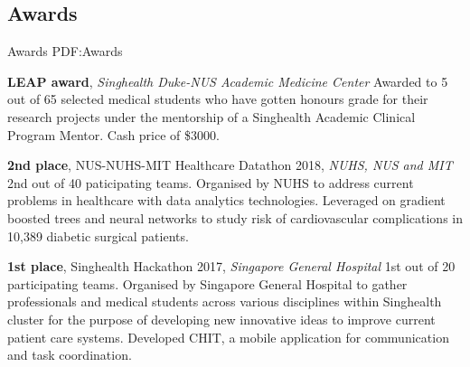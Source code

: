 \documentclass[letterpaper,10pt,oneside]{article}
\begin{document}
\begin{body}
\section
{Awards}
{Awards}
{PDF:Awards}

\textbf{LEAP award}, \textit{Singhealth Duke-NUS Academic Medicine Center}
\hfill{}
\GapNoBreak
\BulletItem
Awarded to 5 out of 65 selected medical students who have gotten honours grade for their research projects under the mentorship of a Singhealth Academic Clinical Program Mentor. Cash price of \$3000.
\GapNoBreak
\medskip

\textbf{2nd place}, \textcolor{mygray}{NUS-NUHS-MIT Healthcare Datathon 2018}, \textit{NUHS, NUS and MIT}
\hfill{}
\GapNoBreak
\BulletItem
2nd out of 40 paticipating teams. Organised by NUHS to address current problems in healthcare with data analytics technologies. Leveraged on gradient boosted trees and neural networks to study risk of cardiovascular complications in 10,389 diabetic surgical patients.
\GapNoBreak
\medskip



\textbf{1st place}, \textcolor{mygray}{Singhealth Hackathon 2017}, \textit{Singapore General Hospital}
\hfill{}
\BulletItem
1st out of 20 participating teams. Organised by Singapore General Hospital to gather professionals and medical students across various disciplines within Singhealth cluster for the purpose of developing new innovative ideas to improve current patient care systems. Developed CHIT, a mobile application for communication and task coordination.
\GapNoBreak
\medskip



\end{body}
\end{document}
